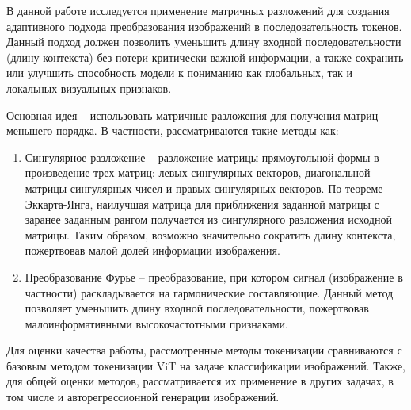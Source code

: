 В данной работе исследуется применение матричных разложений для создания адаптивного подхода преобразования изображений в последовательность токенов. Данный подход должен позволить уменьшить длину входной последовательности (длину контекста) без потери критически важной информации, а также сохранить или улучшить способность модели к пониманию как глобальных, так и локальных визуальных признаков. 

Основная идея – использовать матричные разложения для получения матриц меньшего порядка. В частности, рассматриваются такие методы как:

\begin{enumerate}
    \item Сингулярное разложение – разложение матрицы прямоугольной формы в произведение трех матриц: левых сингулярных векторов, диагональной матрицы сингулярных чисел и правых сингулярных векторов. По теореме Эккарта-Янга, наилучшая матрица для приближения заданной матрицы с заранее заданным рангом получается из сингулярного разложения исходной матрицы. Таким образом, возможно значительно сократить длину контекста, пожертвовав малой долей информации изображения.
    \item Преобразование Фурье – преобразование, при котором сигнал (изображение в частности) раскладывается на гармонические составляющие. Данный метод позволяет уменьшить длину входной последовательности, пожертвовав малоинформативными высокочастотными признаками.
\end{enumerate}

Для оценки качества работы, рассмотренные методы токенизации сравниваются с базовым методом токенизации ViT на задаче классификации изображений. Также, для общей оценки методов, рассматривается их применение в других задачах, в том числе и авторегрессионной генерации изображений.
